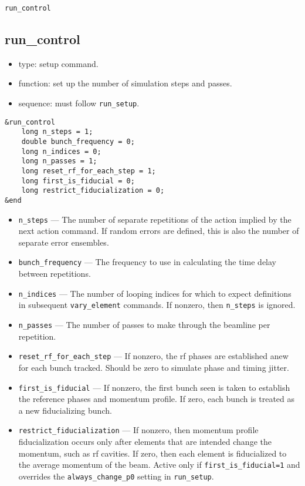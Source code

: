\documentclass[11pt]{article}
\begin{document}
\newpage
\begin{center}{\Large\verb|run_control|}\end{center}
\subsection{run\_control \label{subsec:runcontrol}}

\begin{itemize}
\item type: setup command.
\item function: set up the number of simulation steps and passes.
\item sequence: must follow \verb|run_setup|.
\end{itemize}

\begin{verbatim}
&run_control
    long n_steps = 1;
    double bunch_frequency = 0;
    long n_indices = 0;
    long n_passes = 1;
    long reset_rf_for_each_step = 1;
    long first_is_fiducial = 0;
    long restrict_fiducialization = 0;
&end
\end{verbatim}

\begin{itemize}
\item \verb|n_steps| --- The number of separate repetitions of the action implied by the next action command.
If random errors are defined, this is also the number of separate error ensembles.
\item \verb|bunch_frequency| --- The frequency to use in calculating the time delay between repetitions.
\item \verb|n_indices| --- The number of looping indices for which to expect definitions in subsequent \verb|vary_element| commands.  If nonzero, then \verb|n_steps| is ignored.
\item \verb|n_passes| --- The number of passes to make through the beamline per repetition.
\item \verb|reset_rf_for_each_step| --- If nonzero, the rf phases are 
established anew for each bunch tracked.  Should be zero to simulate
phase and timing jitter. 
\item \verb|first_is_fiducial| --- If nonzero, the first bunch seen is taken
to establish the reference phases and momentum profile.  If zero, each bunch
is treated as a new fiducializing bunch.
\item \verb|restrict_fiducialization| --- If nonzero, then  momentum profile
fiducialization occurs only after elements that are intended
change the momentum, such as rf cavities.  If zero, then each element is
fiducialized to the average momentum of the beam.
Active only if \verb|first_is_fiducial=1| and overrides the \verb|always_change_p0| setting 
in \verb|run_setup|.
\end{itemize}
\end{document}
